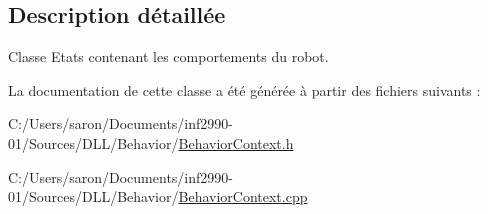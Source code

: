 \subsection{Description détaillée}
Classe Etats contenant les comportements du robot. 

La documentation de cette classe a été générée à partir des fichiers suivants \-:\begin{DoxyCompactItemize}
\item 
C\-:/\-Users/saron/\-Documents/inf2990-\/01/\-Sources/\-D\-L\-L/\-Behavior/\hyperlink{_behavior_context_8h}{Behavior\-Context.\-h}\item 
C\-:/\-Users/saron/\-Documents/inf2990-\/01/\-Sources/\-D\-L\-L/\-Behavior/\hyperlink{_behavior_context_8cpp}{Behavior\-Context.\-cpp}\end{DoxyCompactItemize}
